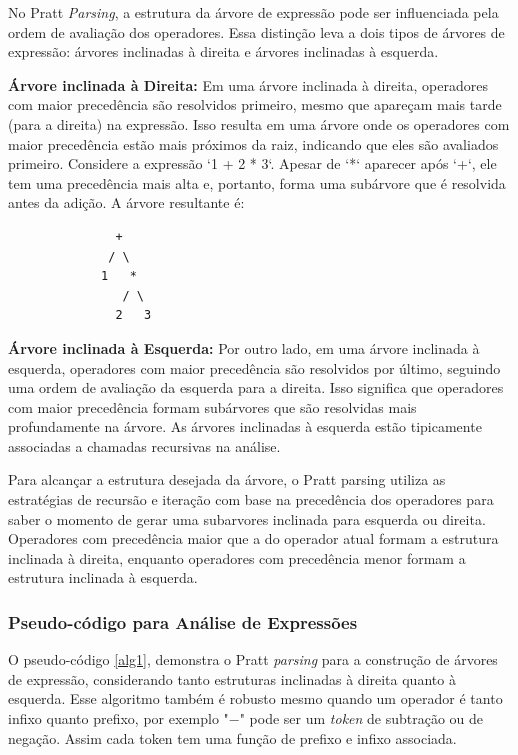\documentclass[english, 
               brazil, 
               bsc] %
               {dcomp-abntex2}
\begin{document}
No Pratt \textit{Parsing}, a estrutura da árvore de expressão pode ser influenciada pela ordem de avaliação dos operadores. Essa distinção leva a dois tipos de árvores de expressão: árvores inclinadas à direita e árvores inclinadas à esquerda.

\textbf{Árvore inclinada à Direita:} Em uma árvore inclinada à direita, operadores com maior precedência são resolvidos primeiro, mesmo que apareçam mais tarde (para a direita) na expressão. Isso resulta em uma árvore onde os operadores com maior precedência estão mais próximos da raiz, indicando que eles são avaliados primeiro. Considere a expressão `1 + 2 * 3`. Apesar de `*` aparecer após `+`, ele tem uma precedência mais alta e, portanto, forma uma subárvore que é resolvida antes da adição. A árvore resultante é:


\begin{verbatim}
               +
              / \
             1   *
                / \
               2   3
\end{verbatim}

\textbf{Árvore inclinada à Esquerda:} Por outro lado, em uma árvore inclinada à esquerda, operadores com maior precedência são resolvidos por último, seguindo uma ordem de avaliação da esquerda para a direita. Isso significa que operadores com maior precedência formam subárvores que são resolvidas mais profundamente na árvore. As árvores inclinadas à esquerda estão tipicamente associadas a chamadas recursivas na análise.

Para alcançar a estrutura desejada da árvore, o Pratt parsing utiliza as estratégias de recursão e iteração com base na precedência dos operadores para saber o momento de gerar uma subarvores inclinada para esquerda ou direita. Operadores com precedência maior que a do operador atual formam a estrutura inclinada à direita, enquanto operadores com precedência menor formam a estrutura inclinada à esquerda.

\subsubsection{Pseudo-código para Análise de Expressões}

O pseudo-código \ref{alg1},
demonstra o Pratt \textit{parsing} para a construção de árvores de expressão, considerando tanto estruturas inclinadas à direita quanto à esquerda. Esse algoritmo também é robusto mesmo quando um operador é tanto infixo quanto prefixo, por exemplo "$-$" pode ser um \textit{token} de subtração ou de negação. Assim cada token tem uma função de prefixo e infixo associada.
\end{document}
